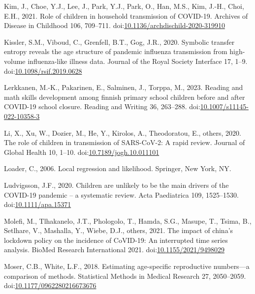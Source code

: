 \documentclass[unnumsec,webpdf,contemporary,large]{oup-authoring-template}%
\theoremstyle{thmstyleone}%
\theoremstyle{thmstyletwo}%
\theoremstyle{thmstylethree}%
\newlength{\cslhangindent}
\newlength{\cslentryspacingunit} %
\newenvironment{CSLReferences}[2] %
 {%
  \setlength{\parindent}{0pt}
  \ifodd #1
  \let\oldpar\par
  \def\par{\hangindent=\cslhangindent\oldpar}
  \fi
  \setlength{\parskip}{#2\cslentryspacingunit}
 }%
 {}
\begin{document}
\begin{CSLReferences}{1}{0}
\leavevmode{}%
Kim, J., Choe, Y.J., Lee, J., Park, Y.J., Park, O., Han, M.S., Kim, J.-H., Choi, E.H., 2021. Role of children in household transmission of COVID-19. Archives of Disease in Childhood 106, 709--711. doi:\href{https://doi.org/10.1136/archdischild-2020-319910}{10.1136/archdischild-2020-319910}

\leavevmode{}%
Kissler, S.M., Viboud, C., Grenfell, B.T., Gog, J.R., 2020. Symbolic transfer entropy reveals the age structure of pandemic influenza transmission from high-volume influenza-like illness data. Journal of the Royal Society Interface 17, 1--9. doi:\href{https://doi.org/10.1098/rsif.2019.0628}{10.1098/rsif.2019.0628}

\leavevmode{}%
Lerkkanen, M.-K., Pakarinen, E., Salminen, J., Torppa, M., 2023. Reading and math skills development among finnish primary school children before and after COVID-19 school closure. Reading and Writing 36, 263--288. doi:\href{https://doi.org/10.1007/s11145-022-10358-3}{10.1007/s11145-022-10358-3}

\leavevmode{}%
Li, X., Xu, W., Dozier, M., He, Y., Kirolos, A., Theodoratou, E., others, 2020. The role of children in transmission of SARS-CoV-2: A rapid review. Journal of Global Health 10, 1--10. doi:\href{https://doi.org/10.7189/jogh.10.011101}{10.7189/jogh.10.011101}

\leavevmode{}%
Loader, C., 2006. Local regression and likelihood. Springer, New York, NY.

\leavevmode{}%
Ludvigsson, J.F., 2020. Children are unlikely to be the main drivers of the COVID-19 pandemic -- a systematic review. Acta Paediatrica 109, 1525--1530. doi:\href{https://doi.org/10.1111/apa.15371}{10.1111/apa.15371}

\leavevmode{}%
Molefi, M., Tlhakanelo, J.T., Phologolo, T., Hamda, S.G., Masupe, T., Tsima, B., Setlhare, V., Mashalla, Y., Wiebe, D.J., others, 2021. The impact of china's lockdown policy on the incidence of CoVID-19: An interrupted time series analysis. BioMed Research International 2021. doi:\href{https://doi.org/10.1155/2021/9498029}{10.1155/2021/9498029}

\leavevmode{}%
Moser, C.B., White, L.F., 2018. Estimating age-specific reproductive numbers---a comparison of methods. Statistical Methods in Medical Research 27, 2050--2059. doi:\href{https://doi.org/10.1177/0962280216673676}{10.1177/0962280216673676}


\end{CSLReferences}
\end{document}
